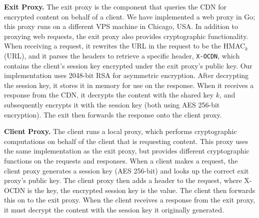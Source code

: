 \textbf{Exit Proxy.} The exit proxy is the component that queries the CDN for
encrypted
content on behalf of a client.  We have implemented a web proxy in Go; this proxy
runs on
a different VPS machine in Chicago, USA.  In addition to proxying web requests, the exit 
proxy also provides cryptographic functionality.  When receiving a request, it rewrites
the URL in the request to be the HMAC$_{k}$(URL), and it parses the headers to retrieve a 
specific header, {\tt X-OCDN}, which contains the client's session key encrypted
under the exit
proxy's public key.  Our implementation uses 2048-bit RSA for asymmetric encryption.  After 
decrypting the session key, it stores it in memory for use on the response.  When 
it receives a response from the CDN, it decrypts the content with the shared key $k$, and 
subsequently encrypts it with the session key (both using AES 256-bit encryption).  The 
exit then forwards the response onto the client proxy.

\textbf{Client Proxy.} The client runs a local proxy, which performs cryptographic computations on behalf of the client that is
requesting
content.  This proxy uses the same implementation as the exit proxy, but provides 
different cryptographic functions on the requests and responses.  When a client makes 
a request, the client proxy generates a session key  (AES 256-bit) and looks up the correct exit proxy's 
public key.  The client proxy then adds a header to the request, 
where X-OCDN is the key, the encrypted session key is the value.  The client then forwards this on to the 
exit proxy.  When the client receives a response from the exit proxy, it must decrypt the content 
with the session key it originally generated.   
